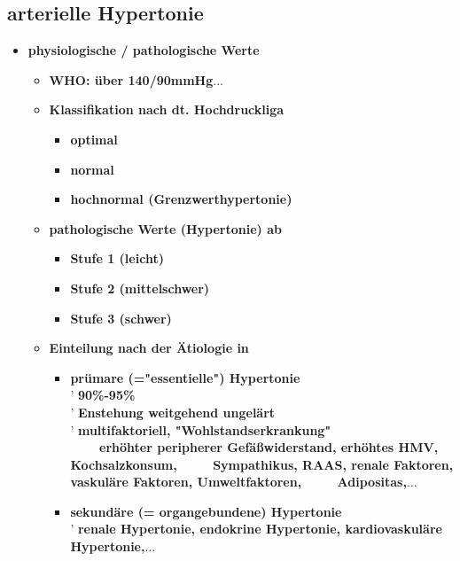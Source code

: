 	\subsection*{arterielle Hypertonie}
		\begin{itemize}
			\item \textbf{physiologische / pathologische Werte}
				\begin{itemize}
					\item \textbf{WHO: über 140/90mmHg$\dots$}
					\item \textbf{Klassifikation nach dt. Hochdruckliga}
						\begin{itemize}
							\item \textbf{optimal}
							\item \textbf{normal}
							\item \textbf{hochnormal (Grenzwerthypertonie)}
						\end{itemize}
					\item \textbf{pathologische Werte (Hypertonie) ab}
						\begin{itemize}
							\item \textbf{Stufe 1 (leicht)}
							\item \textbf{Stufe 2 (mittelschwer)}
							\item \textbf{Stufe 3 (schwer)}
						\end{itemize}
					\item \textbf{Einteilung nach der Ätiologie in}
						\begin{itemize}
							\item \textbf{prümare (="essentielle") Hypertonie}\\
								' \textbf{90\%-95\%}\\
								' \textbf{Enstehung weitgehend ungelärt}\\
								' \textbf{multifaktoriell, "Wohlstandserkrankung"}\\
								$\mbox{}\qquad$ \textbf{erhöhter peripherer Gefäßwiderstand, erhöhtes HMV, Kochsalzkonsum,}\linebreak
								$\mbox{}\qquad\:$ \textbf{Sympathikus, RAAS, renale Faktoren, vaskuläre Faktoren, Umweltfaktoren,}\linebreak
								$\mbox{}\qquad\:$ \textbf{Adipositas,$\dots$}
							\item \textbf{sekundäre (= organgebundene) Hypertonie}\\
								' \textbf{renale Hypertonie, endokrine Hypertonie, kardiovaskuläre Hypertonie,$\dots$}
						\end{itemize}

\end{itemize}
\end{itemize}
